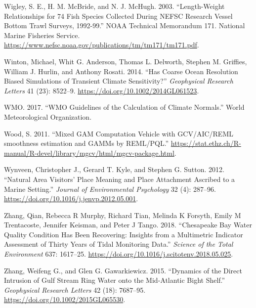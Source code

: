 \documentclass[
]{book}
\begin{document}
\leavevmode\hypertarget{ref-wigley_length-weight_2003}{}%
Wigley, S. E., H. M. McBride, and N. J. McHugh. 2003. ``Length-Weight Relationships for 74 Fish Species Collected During NEFSC Research Vessel Bottom Trawl Surveys, 1992-99.'' NOAA Technical Memorandum 171. National Marine Fisheries Service. \url{https://www.nefsc.noaa.gov/publications/tm/tm171/tm171.pdf}.

\leavevmode\hypertarget{ref-winton_has_2014}{}%
Winton, Michael, Whit G. Anderson, Thomas L. Delworth, Stephen M. Griffies, William J. Hurlin, and Anthony Rosati. 2014. ``Has Coarse Ocean Resolution Biased Simulations of Transient Climate Sensitivity?'' \emph{Geophysical Research Letters} 41 (23): 8522--9. \url{https://doi.org/10.1002/2014GL061523}.

\leavevmode\hypertarget{ref-WMO2017}{}%
WMO. 2017. ``WMO Guidelines of the Calculation of Climate Normals.'' World Meteorological Organization.

\leavevmode\hypertarget{ref-Wood2011a}{}%
Wood, S. 2011. ``Mixed GAM Computation Vehicle with GCV/AIC/REML smoothness estimation and GAMMs by REML/PQL.'' \url{https://stat.ethz.ch/R-manual/R-devel/library/mgcv/html/mgcv-package.html}.

\leavevmode\hypertarget{ref-wynveen_natural_2012}{}%
Wynveen, Christopher J., Gerard T. Kyle, and Stephen G. Sutton. 2012. ``Natural Area Visitors' Place Meaning and Place Attachment Ascribed to a Marine Setting.'' \emph{Journal of Environmental Psychology} 32 (4): 287--96. \url{https://doi.org/10.1016/j.jenvp.2012.05.001}.

\leavevmode\hypertarget{ref-zhang2018}{}%
Zhang, Qian, Rebecca R Murphy, Richard Tian, Melinda K Forsyth, Emily M Trentacoste, Jennifer Keisman, and Peter J Tango. 2018. ``Chesapeake Bay Water Quality Condition Has Been Recovering: Insights from a Multimetric Indicator Assessment of Thirty Years of Tidal Monitoring Data.'' \emph{Science of the Total Environment} 637: 1617--25. \url{https://doi.org/10.1016/j.scitotenv.2018.05.025}.

\leavevmode\hypertarget{ref-zhang_dynamics_2015}{}%
Zhang, Weifeng G., and Glen G. Gawarkiewicz. 2015. ``Dynamics of the Direct Intrusion of Gulf Stream Ring Water onto the Mid-Atlantic Bight Shelf.'' \emph{Geophysical Research Letters} 42 (18): 7687--95. \url{https://doi.org/10.1002/2015GL065530}.
\end{document}
